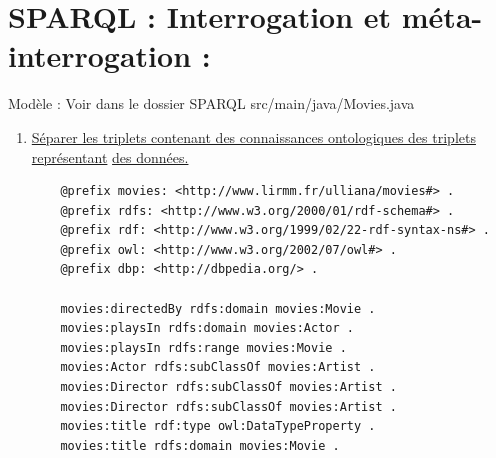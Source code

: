 \documentclass[12pt,a4paper]{article}
\begin{document}
    \section{SPARQL : Interrogation et méta-interrogation :}
    \begin{justify}
        Mod\`ele : Voir dans le dossier SPARQL src/main/java/Movies.java
        \begin{enumerate}
            \item \underline{S\'eparer les triplets contenant des connaissances ontologiques des triplets repr\'esentant} \underline{des donn\'ees.}
            \begin{verbatim}
    @prefix movies: <http://www.lirmm.fr/ulliana/movies#> .
    @prefix rdfs: <http://www.w3.org/2000/01/rdf-schema#> .
    @prefix rdf: <http://www.w3.org/1999/02/22-rdf-syntax-ns#> .
    @prefix owl: <http://www.w3.org/2002/07/owl#> .
    @prefix dbp: <http://dbpedia.org/> .

    movies:directedBy rdfs:domain movies:Movie .
    movies:playsIn rdfs:domain movies:Actor .
    movies:playsIn rdfs:range movies:Movie .
    movies:Actor rdfs:subClassOf movies:Artist .
    movies:Director rdfs:subClassOf movies:Artist .
    movies:Director rdfs:subClassOf movies:Artist .
    movies:title rdf:type owl:DataTypeProperty .
    movies:title rdfs:domain movies:Movie .


\end{verbatim}
\end{enumerate}
\end{justify}
\end{document}
